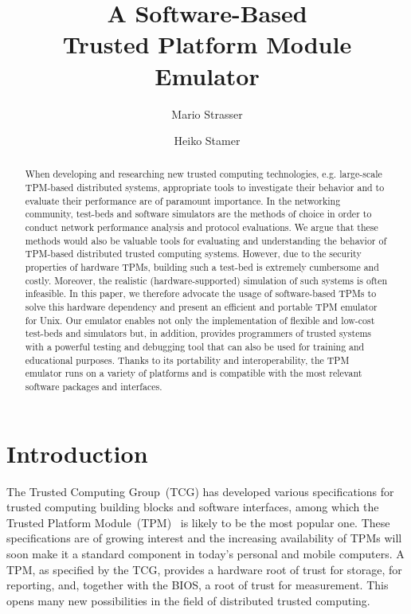\documentclass[runningheads]{llncs}
\title{A Software-Based\\ Trusted Platform Module Emulator}
\author{Mario Strasser\inst{1} \and Heiko Stamer\inst{2}}
\institute{
	ETH Zurich, Switzerland\\
	\email{strasser@tik.ee.ethz.ch}\\[3mm]
\and
	Fachbereich Elektrotechnik/Informatik, Universit\"at Kassel\\
	34109 Kassel, Germany\\
	\email{stamer@theory.informatik.uni-kassel.de}\\
}
\date{}
\begin{document}
\maketitle

\begin{abstract}
	When developing and researching new trusted computing technologies, e.g.
	large-scale TPM-based distributed systems, appropriate tools to investigate
	their behavior and to evaluate their performance are of paramount
	importance. In the networking community, test-beds and software simulators
	are the methods of choice in order to conduct network performance analysis
	and protocol evaluations. We argue that these methods would also be valuable
	tools for evaluating and understanding the behavior of TPM-based distributed
	trusted computing systems. However, due to the security properties of
	hardware TPMs, building such a test-bed is extremely cumbersome and costly.
	Moreover, the realistic (hardware-supported) simulation of such systems is
	often infeasible. In this paper, we therefore advocate the usage of
	software-based TPMs to solve this hardware dependency and present an
	efficient and portable TPM emulator for Unix. Our emulator enables not only
	the implementation of flexible and low-cost test-beds and simulators but,
	in addition, provides programmers of trusted systems with a powerful testing
	and debugging tool that can also be used for training and educational
	purposes. Thanks to its portability and interoperability, the TPM emulator
	runs on a variety of platforms and is compatible with the most relevant
	software packages and interfaces.
\end{abstract}


\section{Introduction}
The Trusted Computing Group~(TCG) has developed various specifications for
trusted computing building blocks and software interfaces, among which the
Trusted Platform Module~(TPM)~\cite{TPM} is likely to be the most popular one.
These specifications are of growing interest and the increasing availability
of TPMs will soon make it a standard component in today's personal and mobile
computers. A TPM, as specified by the TCG, provides a hardware root of trust
for storage, for reporting, and, together with the BIOS, a root of trust for
measurement. This opens many new possibilities in the field of distributed
trusted computing.
\end{document}
